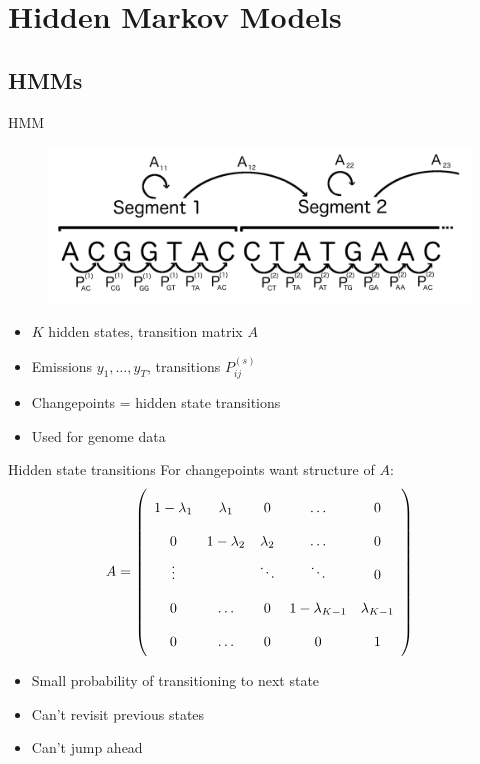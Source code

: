\documentclass{beamer}
\begin{document}


\section{Hidden Markov Models}

\subsection{HMMs}


\begin{frame}{HMM}
\begin{figure}
\includegraphics[width=\textwidth]{fig1.pdf}
\end{figure}
\begin{itemize}
\item $K$ hidden states, transition matrix $A$
\item Emissions $y_1, \hdots, y_T$, transitions $P_{ij}^{(s)}$
\item Changepoints = hidden state transitions
\item Used for genome data \citep{churchill, yeast}
\end{itemize}
\end{frame}


\begin{frame}{Hidden state transitions}
For changepoints want structure of $A$:
\[
\begingroup
\renewcommand*{\arraystretch}{2}
A = \left( {\begin{array}{ccccc}
1-\lambda_1 	& \lambda_1 	& 0 			& \hdots 				& 0\\
0 			& 1-\lambda_2 	& \lambda_2 	& \hdots				& 0\\
\vdots 		&			& \ddots		& \ddots					& 0\\
0 			& \hdots	 	& 0		 	& 1-\lambda_{K-1} 		& \lambda_{K-1} \\
0			& \hdots		& 0			& 0					& 1 \\
\end{array}} \right)
\endgroup
\]
\begin{itemize}
\item Small probability of transitioning to next state
\item Can't revisit previous states
\item Can't jump ahead
\end{itemize}
\end{frame}
\end{document}
